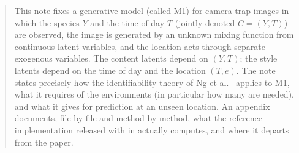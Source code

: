 \begin{abstract}
\noindent
This note fixes a generative model (called M1) for camera-trap images in which the species $Y$ and the
time of day $T$ (jointly denoted $C=(Y,T)$) are observed, the image is generated by an unknown mixing
function from continuous latent variables, and the location acts through separate exogenous
variables. The content latents depend on $(Y,T)$; the style latents depend on the time of day and the
location $(T,e)$. The note states precisely how the identifiability theory of Ng et
al.~\cite{ng2025} applies to M1, what it requires of the environments (in particular how many are
needed), and what it gives for prediction at an unseen location. An appendix documents, file by file 
and method by method, what the reference implementation released with \cite{ng2025} in 
\cite{ngimpl} actually computes, and where it departs from the paper.
\end{abstract}
